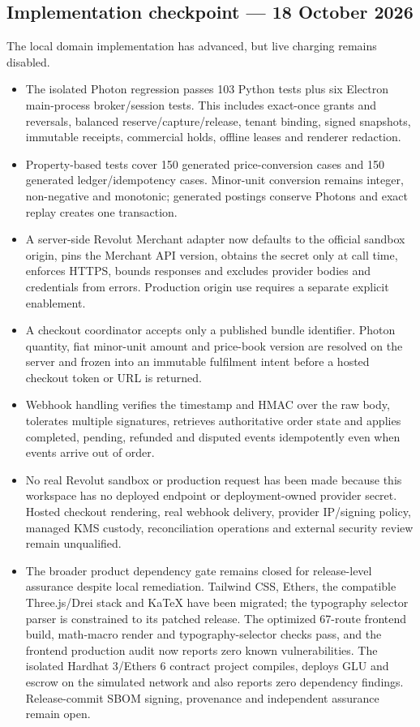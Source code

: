 \documentclass[11pt]{article}
\begin{document}
\subsection*{Implementation checkpoint --- 18 October 2026}

The local domain implementation has advanced, but live charging remains disabled.

\begin{itemize}
  \item The isolated Photon regression passes 103 Python tests plus six Electron main-process broker/session tests. This includes exact-once grants and reversals, balanced reserve/capture/release, tenant binding, signed snapshots, immutable receipts, commercial holds, offline leases and renderer redaction.
  \item Property-based tests cover 150 generated price-conversion cases and 150 generated ledger/idempotency cases. Minor-unit conversion remains integer, non-negative and monotonic; generated postings conserve Photons and exact replay creates one transaction.
  \item A server-side Revolut Merchant adapter now defaults to the official sandbox origin, pins the Merchant API version, obtains the secret only at call time, enforces HTTPS, bounds responses and excludes provider bodies and credentials from errors. Production origin use requires a separate explicit enablement.
  \item A checkout coordinator accepts only a published bundle identifier. Photon quantity, fiat minor-unit amount and price-book version are resolved on the server and frozen into an immutable fulfilment intent before a hosted checkout token or URL is returned.
  \item Webhook handling verifies the timestamp and HMAC over the raw body, tolerates multiple signatures, retrieves authoritative order state and applies completed, pending, refunded and disputed events idempotently even when events arrive out of order.
  \item No real Revolut sandbox or production request has been made because this workspace has no deployed endpoint or deployment-owned provider secret. Hosted checkout rendering, real webhook delivery, provider IP/signing policy, managed KMS custody, reconciliation operations and external security review remain unqualified.
  \item The broader product dependency gate remains closed for release-level assurance despite local remediation. Tailwind CSS, Ethers, the compatible Three.js/Drei stack and KaTeX have been migrated; the typography selector parser is constrained to its patched release. The optimized 67-route frontend build, math-macro render and typography-selector checks pass, and the frontend production audit now reports zero known vulnerabilities. The isolated Hardhat 3/Ethers 6 contract project compiles, deploys GLU and escrow on the simulated network and also reports zero dependency findings. Release-commit SBOM signing, provenance and independent assurance remain open.
\end{itemize}
\end{document}
